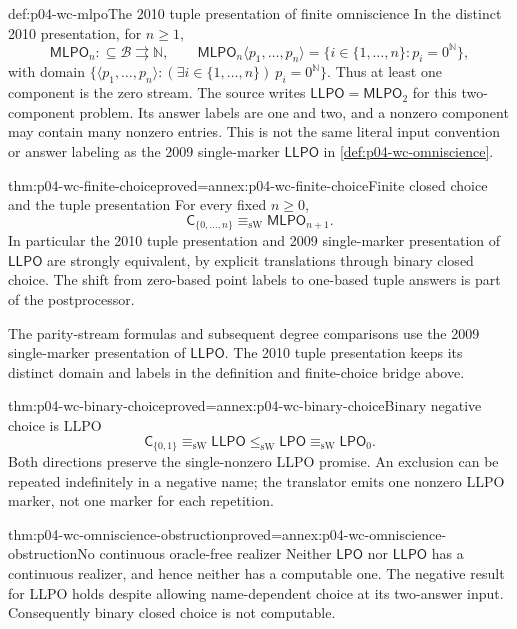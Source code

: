\begin{hbdefinition}{def:p04-wc-mlpo}{The 2010 tuple presentation of finite omniscience}
In the distinct 2010 presentation, for \(n\geq1\),
\[
 \mathsf{MLPO}_n:\subseteq\mathcal B\rightrightarrows\mathbb N,
 \qquad \mathsf{MLPO}_n\langle p_1,\ldots,p_n\rangle
       =\{i\in\{1,\ldots,n\}:p_i=0^{\mathbb N}\},
\]
with domain
\(\{\langle p_1,\ldots,p_n\rangle:(\exists i\in\{1,\ldots,n\})
\ p_i=0^{\mathbb N}\}\). Thus at least one component is the zero stream.
The source writes \(\mathsf{LLPO}=\mathsf{MLPO}_2\) for this
two-component problem. Its answer labels are one and two, and a
nonzero component may contain many nonzero entries. This is not the
same literal input convention or answer labeling as the 2009
single-marker \(\mathsf{LLPO}\) in \cref{def:p04-wc-omniscience}.
\end{hbdefinition}

\begin{hbtheorem}{thm:p04-wc-finite-choice}{proved=annex:p04-wc-finite-choice}{Finite closed choice and the tuple presentation}
For every fixed \(n\geq0\),
\[
 \mathsf{C}_{\{0,\ldots,n\}}\equiv_{\mathrm{sW}}
                                      \mathsf{MLPO}_{n+1}.
\]
In particular the 2010 tuple presentation and 2009 single-marker
presentation of \(\mathsf{LLPO}\) are strongly equivalent, by
explicit translations through binary closed choice. The shift from
zero-based point labels to one-based tuple answers is part of the
postprocessor.
\end{hbtheorem}

The parity-stream formulas and subsequent degree comparisons use the
2009 single-marker presentation of \(\mathsf{LLPO}\). The 2010 tuple
presentation keeps its distinct domain and labels in the definition
and finite-choice bridge above.

\begin{hbtheorem}{thm:p04-wc-binary-choice}{proved=annex:p04-wc-binary-choice}{Binary negative choice is LLPO}
\[
 \mathsf{C}_{\{0,1\}}\equiv_{\mathrm{sW}}\mathsf{LLPO}
 \leq_{\mathrm{sW}}\mathsf{LPO}\equiv_{\mathrm{sW}}\mathsf{LPO}_0.
\]
Both directions preserve the single-nonzero LLPO promise. An exclusion
can be repeated indefinitely in a negative name; the translator emits
one nonzero LLPO marker, not one marker for each repetition.
\end{hbtheorem}

\begin{hbtheorem}{thm:p04-wc-omniscience-obstruction}{proved=annex:p04-wc-omniscience-obstruction}{No continuous oracle-free realizer}
Neither \(\mathsf{LPO}\) nor \(\mathsf{LLPO}\) has a continuous
realizer, and hence neither has a computable one. The negative result
for LLPO holds despite allowing name-dependent choice at its two-answer
input. Consequently binary closed choice is not computable.
\end{hbtheorem}

